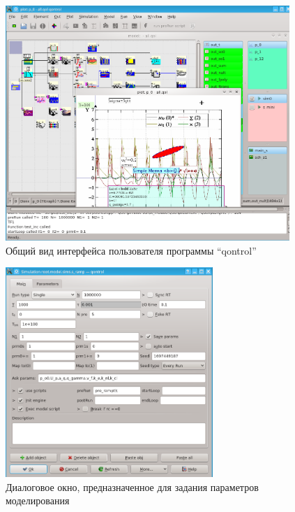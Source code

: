 \begin{figure}[htb!]
  \begin{center}
    \includegraphics[width=0.96\textwidth]{p/qontrol_all.png}
  \end{center}
  \caption{Общий вид интерфейса пользователя программы ``qontrol''}
  \label{atu:f:qontrol_all}
\end{figure}






\begin{figure}[htb!]
  \begin{center}
    \includegraphics[width=0.7\textwidth]{p/qontrol_task.png}
  \end{center}
  \caption{Диалоговое окно, предназначенное для задания параметров моделирования}
  \label{atu:f:qontrol_simul}
\end{figure}


